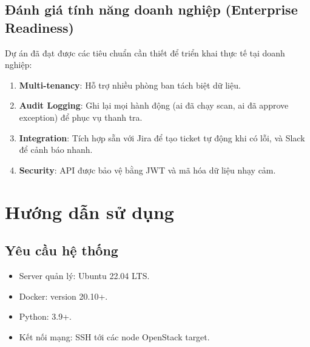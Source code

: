 \documentclass[12pt,a4paper]{report}
\begin{document}
\section{Đánh giá tính năng doanh nghiệp (Enterprise Readiness)}
Dự án đã đạt được các tiêu chuẩn cần thiết để triển khai thực tế tại doanh nghiệp:
\begin{enumerate}
    \item \textbf{Multi-tenancy}: Hỗ trợ nhiều phòng ban tách biệt dữ liệu.
    \item \textbf{Audit Logging}: Ghi lại mọi hành động (ai đã chạy scan, ai đã approve exception) để phục vụ thanh tra.
    \item \textbf{Integration}: Tích hợp sẵn với Jira để tạo ticket tự động khi có lỗi, và Slack để cảnh báo nhanh.
    \item \textbf{Security}: API được bảo vệ bằng JWT và mã hóa dữ liệu nhạy cảm.
\end{enumerate}

\chapter{Hướng dẫn sử dụng}

\section{Yêu cầu hệ thống}
\begin{itemize}
    \item Server quản lý: Ubuntu 22.04 LTS.
    \item Docker: version 20.10+.
    \item Python: 3.9+.
    \item Kết nối mạng: SSH tới các node OpenStack target.
\end{itemize}
\end{document}
